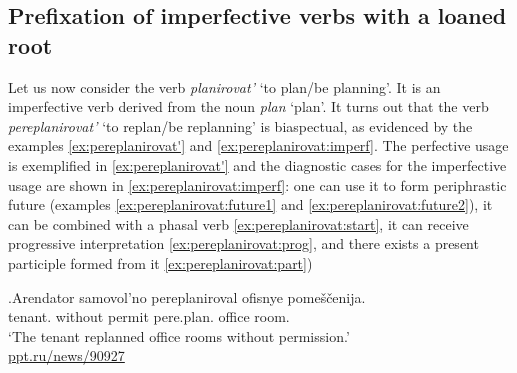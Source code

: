 

\subsection{Prefixation of imperfective verbs with a loaned root}\label{subsection:perf:imperf}
Let us now consider the verb \textit{planirovat'} `to plan/be planning'. It is an imperfective verb derived from the noun \textit{plan} `plan'. It turns out that the verb \textit{pereplanirovat'} `to replan/be replanning' is biaspectual, as evidenced by the examples \ref{ex:pereplanirovat'} and \ref{ex:pereplanirovat:imperf}. The perfective usage is exemplified in \ref{ex:pereplanirovat'} and the diagnostic cases for the imperfective usage are shown in \ref{ex:pereplanirovat:imperf}: one can use it to form periphrastic future (examples \ref{ex:pereplanirovat:future1} and \ref{ex:pereplanirovat:future2}), it can be combined with a phasal verb \ref{ex:pereplanirovat:start}, it can receive progressive interpretation \ref{ex:pereplanirovat:prog}, and there exists a present participle formed from it \ref{ex:pereplanirovat:part}) 

\exg.\label{ex:pereplanirovat'}Arendator samovol'no pereplaniroval\textsuperscript{\PF} ofisnye pome\v{s}\v{c}enija.\\
tenant. {without permit} pere.plan. office room.\\
\trans `The tenant replanned office rooms without permission.'\\\hbox{}\hfill\hbox{\url{ppt.ru/news/90927}}

